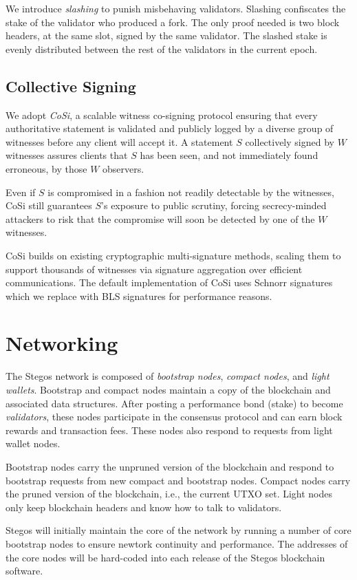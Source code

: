 \documentclass[8pt,fleqn,openany]{book}
\begin{document}
We introduce \textit{slashing} to punish misbehaving validators. Slashing confiscates the stake of the validator who produced a fork. The only proof needed is two block headers, at the same slot, signed by the same validator. The slashed stake is evenly distributed between the rest of the validators in the current epoch.

\subsection{Collective Signing}
We adopt \textit{CoSi}\cite{c10,c11}, a scalable witness co-signing protocol ensuring that every authoritative statement is validated and publicly logged by a diverse group of witnesses before any client will accept it. A statement $S$ collectively signed by $W$ witnesses assures clients that $S$ has been seen, and not immediately found erroneous, by those $W$ observers. 

Even if $S$ is compromised in a fashion not readily detectable by the witnesses, CoSi still guarantees $S$’s exposure to public scrutiny, forcing secrecy-minded attackers to risk that the compromise will soon be detected by one of the $W$ witnesses. 

CoSi builds on existing cryptographic multi-signature methods, scaling them to support thousands of witnesses via signature aggregation over efficient communications. The default implementation of CoSi uses Schnorr signatures which we replace with BLS signatures for performance reasons.
	
\section{Networking}
The Stegos network is composed of \textit{bootstrap nodes}, \textit{compact nodes}, and \textit{light wallets}. Bootstrap and compact nodes maintain a copy of the blockchain and associated data structures. After posting a performance bond (stake) to become \textit{validators}, these nodes participate in the consensus protocol and can earn block rewards and transaction fees. These nodes also respond to requests from light wallet nodes.

Bootstrap nodes carry the unpruned version of the blockchain and respond to bootstrap requests from new compact and bootstrap nodes. Compact nodes carry the pruned version of the blockchain, i.e., the current UTXO set. Light nodes only keep blockchain headers and know how to talk to validators. 

Stegos will initially maintain the core of the network by running a number of core bootstrap nodes to ensure newtork continuity and performance. The addresses of the core nodes will be hard-coded into each release of the Stegos blockchain software.
\end{document}
